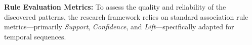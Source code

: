 \documentclass{isd}
\begin{document}
{%

\textbf{Rule Evaluation Metrics:} To assess the quality and reliability of the discovered patterns, the research framework relies on standard association rule metrics—primarily \textit{Support}, \textit{Confidence}, and \textit{Lift}—specifically adapted for temporal sequences.





}
\end{document}
